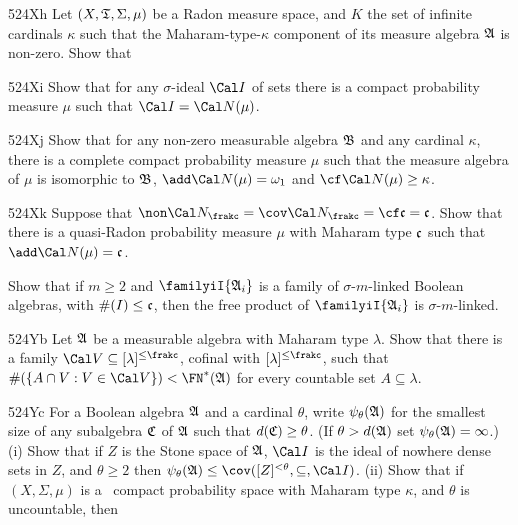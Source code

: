 {\spheader 524Xh Let $(X,\frak T,\Sigma,\mu)$ be a Radon measure space,
and $K$ the set of infinite cardinals $\kappa$ such that the
Maharam-type-$\kappa$ component of its measure algebra $\frak A$ is
non-zero.   Show that


\spheader 524Xi Show that for any $\sigma$-ideal $\Cal I$ of sets there
is a compact probability measure $\mu$ such that $\Cal I=\Cal N(\mu)$.

\spheader 524Xj Show that for any non-zero measurable algebra $\frak B$
and any cardinal $\kappa$, there is a complete compact probability
measure $\mu$ such that the measure algebra of $\mu$ is isomorphic to
$\frak B$, $\add\Cal N(\mu)=\omega_1$ and $\cf\Cal N(\mu)\ge\kappa$.

\spheader 524Xk Suppose that
$\non\Cal N_{\frakc}=\cov\Cal N_{\frakc}=\cf\frak c=\frak c$.   Show that
there is a quasi-Radon probability measure $\mu$ with Maharam type
$\frak c$ such that $\add\Cal N(\mu)=\frak c$.

Show that if $m\ge 2$ and
$\familyiI{\frak A_i}$ is a family of $\sigma$-$m$-linked
Boolean algebras, with $\#(I)\le\frak c$, then the free product of
$\familyiI{\frak A_i}$ is $\sigma$-$m$-linked.

\spheader 524Yb
Let $\frak A$ be a measurable algebra with Maharam type $\lambda$.
Show that there is a family
$\Cal V\subseteq[\lambda]^{\le\frakc}$, cofinal with
$[\lambda]^{\le\frakc}$, such that
$\#(\{A\cap V:V\in\Cal V\})<\FN^*(\frak A)$
for every countable set $A\subseteq\lambda$.

\spheader 524Yc For a Boolean algebra $\frak A$ and a
cardinal $\theta$, write $\psi_{\theta}(\frak A)$ for the smallest
size of any subalgebra $\frak C$ of $\frak A$ such that
$d(\frak C)\ge\theta$.   (If $\theta>d(\frak A)$ set
$\psi_{\theta}(\frak A)=\infty$.)
(i) Show that if $Z$ is the Stone space of $\frak A$, $\Cal I$ is the ideal
of nowhere dense sets in $Z$, and $\theta\ge 2$ then
$\psi_{\theta}(\frak A)\le\cov([Z]^{<\theta},\subseteq,\Cal I)$.
(ii) Show that if $(X,\Sigma,\mu)$ is a \Mth\ compact probability
space with Maharam type $\kappa$, and $\theta$ is uncountable, then

}
